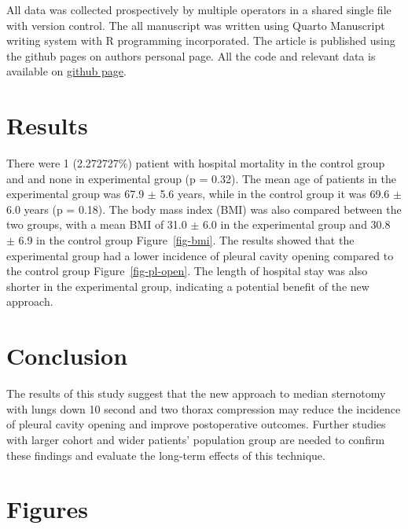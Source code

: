 \documentclass[
  letterpaper,
  DIV=11,
  numbers=noendperiod]{scrartcl}
\begin{document}
All data was collected prospectively by multiple operators in a shared
single file with version control. The all manuscript was written using
Quarto Manuscript writing system with R programming incorporated. The
article is published using the github pages on authors personal page.
All the code and relevant data is available on
\href{https://github.com/raffdoc/manuscript-template}{github page}.

\section{Results}\label{results}

There were 1 (2.272727\%) patient with hospital mortality in the control
group and and none in experimental group (p = 0.32). The mean age of
patients in the experimental group was 67.9 \(\pm\) 5.6 years, while in
the control group it was 69.6 \(\pm\) 6.0 years (p = 0.18). The body
mass index (BMI) was also compared between the two groups, with a mean
BMI of 31.0 \(\pm\) 6.0 in the experimental group and 30.8 \(\pm\) 6.9
in the control group Figure~\ref{fig-bmi}. The results showed that the
experimental group had a lower incidence of pleural cavity opening
compared to the control group Figure~\ref{fig-pl-open}. The length of
hospital stay was also shorter in the experimental group, indicating a
potential benefit of the new approach.

\section{Conclusion}\label{conclusion}

The results of this study suggest that the new approach to median
sternotomy with lungs down 10 second and two thorax compression may
reduce the incidence of pleural cavity opening and improve postoperative
outcomes. Further studies with larger cohort and wider patients'
population group are needed to confirm these findings and evaluate the
long-term effects of this technique.

\section{Figures}\label{figures}
\end{document}
